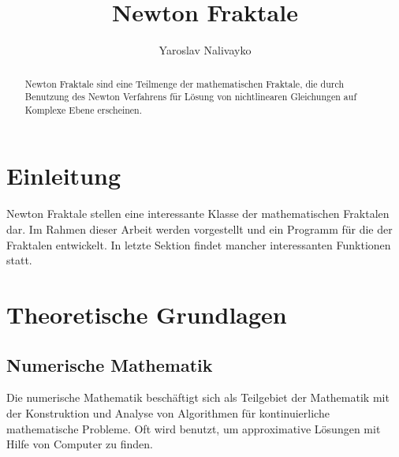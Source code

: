 \documentclass[a4paper,12pt]{llncs}
\numberwithin{equation}{section}
\begin{document}


\author{Yaroslav Nalivayko}

\title{Newton Fraktale}

\maketitle

\thispagestyle{empty}

\begin{abstract}
Newton Fraktale sind eine Teilmenge der mathematischen Fraktale, die durch Benutzung des Newton Verfahrens für Lösung von nichtlinearen Gleichungen auf Komplexe Ebene erscheinen.
\end{abstract}

\section{Einleitung}
Newton Fraktale stellen eine interessante Klasse der mathematischen Fraktalen dar. 
Im Rahmen dieser Arbeit werden  vorgestellt und ein Programm für die  der Fraktalen entwickelt. In letzte Sektion findet  mancher interessanten Funktionen statt.


\section{Theoretische Grundlagen}\label{sec:theo}
\subsection{Numerische Mathematik}
Die numerische Mathematik beschäftigt sich als Teilgebiet der Mathematik mit der Konstruktion und Analyse von Algorithmen für kontinuierliche mathematische Probleme. \cite{nummath}
Oft wird benutzt, um approximative Lösungen mit Hilfe von Computer zu finden.
\end{document}
